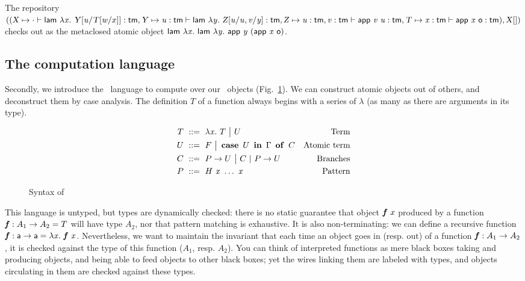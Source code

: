 \documentclass{llncs}
\begin{document}
\begin{example}
  The repository
$
((
\text{\textsl{X}} \mapsto
\cdot\vdash
{\ensuremath{\text{\textsf{lam}}}}\  \lambda{\ensuremath{\text{\textit{x}}}}.\  {\text{\textsl{Y}}}[{{\text{\textit{u}}}/{{\text{\textsl{T}}}[{{\text{\textit{w}}}/{x}}]}}] :
\text{\textsf{tm}},
\text{\textsl{Y}} \mapsto
{\ensuremath{\text{\textit{u}}}}:{\text{\textsf{tm}}} \vdash
{\ensuremath{\text{\textsf{lam}}}}\  \lambda{\ensuremath{\text{\textit{y}}}}.\  {\text{\textsl{Z}}}[{{{\text{\textit{u}}}/{\text{\textit{u}}}},{{\text{\textit{v}}}/{\text{\textit{y}}}} }] :
\text{\textsf{tm}}
,
\text{\textsl{Z}} \mapsto
{{\ensuremath{\text{\textit{u}}}}:{\ensuremath{\text{\textsf{tm}}}}},{{\text{\textit{v}}}:{\text{\textsf{tm}}}} \vdash
{{\ensuremath{\text{\textsf{app}}}}\ {\ensuremath{\text{\textit{v}}}}}\ {\text{\textit{u}}} :
\text{\textsf{tm}}
,
\text{\textsl{T}} \mapsto
{\ensuremath{\text{\textit{x}}}}:{\text{\textsf{tm}}} \vdash
{\ensuremath{\text{\textsf{app}}}}\ {\text{\textit{x}}}\ {\text{\textsf{o}}} :
\text{\textsf{tm}}
), {\text{\textsl{X}}}[{}])
$
checks out as the metaclosed atomic object
$
  {\text{\textsf{lam}}}\  \lambda{\ensuremath{\text{\textit{x}}}}.\ 
    {\text{\textsf{lam}}}\  \lambda{\ensuremath{\text{\textit{y}}}}.\ 
      {\text{\textsf{app}}}\  {\text{\textit{y}}}\ 
      (
        {\text{\textsf{app}}}\ {\text{\textit{x}}}\ {\text{\textsf{o}}}
      )
$.
\end{example}

\subsection{The computation language}
\label{sec:comput}

Secondly, we introduce the \CL\ language to compute over our \SLF\
objects (Fig.~\ref{fig:syntax-CL}). We can construct atomic objects
out of others, and deconstruct them by case analysis. The definition
$T$ of a function always begins with a series of $\lambda$ (as many as
there are arguments in its type).

\begin{figure}[t]
  \begin{align*}
    T &\ ::=\  \lambda{\ensuremath{\text{\textit{x}}}}.\  T \ {\big|}\ 
    U & \text{Term} \\
    U &\ ::=\  F \ {\big|}\ 
    \operatorname{\bf case}\ {{U}\ \operatorname{\bf in}\ {\Gamma}}\ \operatorname{\bf of}\  C & \text{Atomic term}\\
    C &\ ::=\  {P}\to U \ {\big|}\ 
    C\ |\ {P}\to U & \text{Branches}\\
    P &\ ::=\  {H}\  {\text{\textit{x}}}\ \ldots\ {\text{\textit{x}}} &\text{Pattern}
  \end{align*}
  \caption{Syntax of \CL}
\label{fig:syntax-CL}
\end{figure}

This language is untyped, but types are dynamically checked: there is
no static guarantee that object ${\text{\textit{\textbf{f}}}}\  x$ produced by a
function $\text{\textit{\textbf{f}}} : A_1\to A_2 = T$ will have type $A_2$, nor that
pattern matching is exhaustive. It is also non-terminating: we can
define a recursive function $\text{\textit{\textbf{f}}} : \text{\textsf{a}}\to \text{\textsf{a}} = \lambda{\ensuremath{\text{\textit{x}}}}.\  {\text{\textit{\textbf{f}}}}\  {\text{\textit{x}}}$. Nevertheless, we want to maintain the invariant
that each time an object goes in (resp. out) of a function $\text{\textit{\textbf{f}}} :
A_1\to A_2$, it is checked against the type of this function ($A_1$,
resp. $A_2$). You can think of interpreted functions as mere black
boxes taking and producing objects, and being able to feed objects to
other black boxes; yet the wires linking them are labeled with types,
and objects circulating in them are checked against these types.
\end{document}
